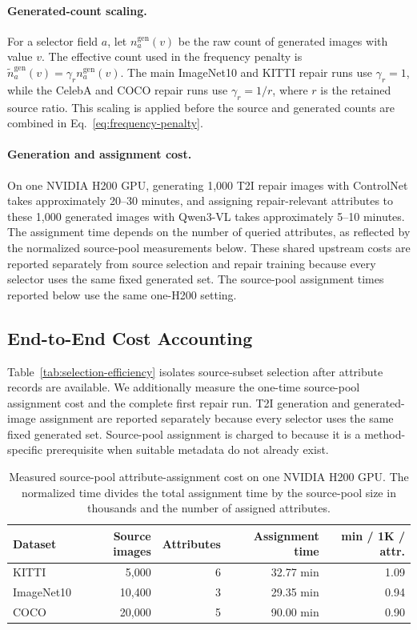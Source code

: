 \paragraph{Generated-count scaling.}
For a selector field $a$, let $n_a^{\mathrm{gen}}(v)$ be the raw count of generated images with value $v$. The effective count used in the frequency penalty is $\tilde{n}_a^{\mathrm{gen}}(v)=\gamma_r n_a^{\mathrm{gen}}(v)$. The main ImageNet10 and KITTI repair runs use $\gamma_r=1$, while the CelebA and COCO repair runs use $\gamma_r=1/r$, where $r$ is the retained source ratio. This scaling is applied before the source and generated counts are combined in Eq.~\ref{eq:frequency-penalty}.

\paragraph{Generation and assignment cost.}
On one NVIDIA H200 GPU, generating 1,000 T2I repair images with ControlNet takes approximately 20--30 minutes, and assigning repair-relevant attributes to these 1,000 generated images with Qwen3-VL takes approximately 5--10 minutes. The assignment time depends on the number of queried attributes, as reflected by the normalized source-pool measurements below. These shared upstream costs are reported separately from source selection and repair training because every selector uses the same fixed generated set. The source-pool assignment times reported below use the same one-H200 setting.

\subsection{End-to-End Cost Accounting}
\label{app:end-to-end-cost}

Table~\ref{tab:selection-efficiency} isolates source-subset selection after attribute records are available. We additionally measure the one-time source-pool assignment cost and the complete first repair run. T2I generation and generated-image assignment are reported separately because every selector uses the same fixed generated set. Source-pool assignment is charged to \model because it is a method-specific prerequisite when suitable metadata do not already exist.

\begin{table}[t]
\centering
\caption{Measured source-pool attribute-assignment cost on one NVIDIA H200 GPU. The normalized time divides the total assignment time by the source-pool size in thousands and the number of assigned attributes.}
\label{tab:source-assignment-cost}
\small
\setlength{\tabcolsep}{4pt}
\begin{tabular}{l r r r r}
\toprule
\rowcolor{sectiongray} \textbf{Dataset} & \textbf{Source images} & \textbf{Attributes} & \textbf{Assignment time} & \textbf{min / 1K / attr.} \\
\midrule
KITTI & 5,000 & 6 & 32.77 min & 1.09 \\
ImageNet10 & 10,400 & 3 & 29.35 min & 0.94 \\
COCO & 20,000 & 5 & 90.00 min & 0.90 \\
\bottomrule
\end{tabular}
\end{table}

